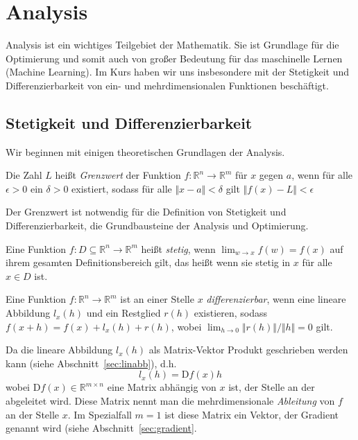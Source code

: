 \section{Analysis}

Analysis ist ein wichtiges Teilgebiet der Mathematik. Sie ist Grundlage für die Optimierung und somit auch von großer Bedeutung für das maschinelle Lernen (Machine Learning). Im Kurs haben wir uns insbesondere mit der Stetigkeit und Differenzierbarkeit von ein- und mehrdimensionalen Funktionen besch\"aftigt.

\subsection{Stetigkeit und Differenzierbarkeit}

Wir beginnen mit einigen theoretischen Grundlagen der Analysis.
\begin{Def} Die Zahl $L$ heißt \emph{Grenzwert} der Funktion $f:\mathbb{R}^n \to \mathbb{R}^m$ für $x$ gegen $a$, wenn für alle $\epsilon > 0$ ein $\delta > 0$ existiert, sodass für alle $\Vert x-a\Vert < \delta$ gilt $\Vert f(x)-L\Vert <\epsilon$
\end{Def}

Der Grenzwert ist notwendig f\"ur die Definition von Stetigkeit und Differenzierbarkeit, die Grundbausteine der Analysis und Optimierung. 
\begin{Def}
Eine Funktion $f: D \subseteq \mathbb{R}^n\rightarrow \mathbb{R}^m$ hei\ss t \emph{stetig}, wenn $\lim_{w\rightarrow x}f(w)=f(x)$ auf ihrem gesamten Definitionsbereich gilt, das heißt wenn sie stetig in $x$ für alle $x\in D$ ist.
\end{Def}
\begin{Def}
\label{def:diffbar}
Eine Funktion $f:\mathbb{R}^n\rightarrow \mathbb{R}^m$ ist an einer Stelle $x$ \emph{differenzierbar}, wenn eine lineare Abbildung $ l_ x (h)$ und ein Restglied $r(h)$ existieren, sodass $f(x+h)=f(x)+l_{x}(h)+r(h)$, wobei $\lim_{h\rightarrow 0} \Vert r(h)\Vert /\Vert h\Vert= 0$ gilt.
\end{Def}

Da die lineare Abbildung $l_x(h)$ als Matrix-Vektor Produkt geschrieben werden kann (siehe Abschnitt~\ref{sec:linabb}), d.h.
\begin{equation*}
l_x(h) = \text{D} f(x) h
\end{equation*}
wobei $\text{D} f(x) \in \mathbb{R}^{m \times n}$ eine Matrix abh\"angig von $x$ ist, der Stelle an der abgeleitet wird. Diese Matrix nennt man die mehrdimensionale \emph{Ableitung} von $f$ an der Stelle $x$.  Im Spezialfall $m=1$ ist diese Matrix ein Vektor, der Gradient genannt wird (siehe Abschnitt~\ref{sec:gradient}.

